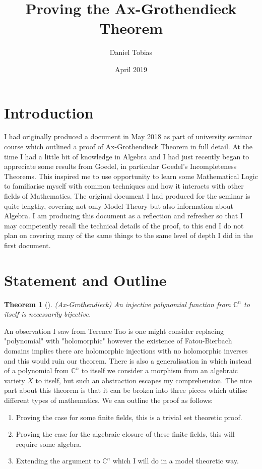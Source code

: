 \documentclass[a4paper]{article}
\title{Proving the Ax-Grothendieck Theorem}
\author{Daniel Tobias}
\date{April 2019}
\newtheorem{theorem}{Theorem}[section]
\newcommand{\C}{\mathbb{C}}
\begin{document}
\maketitle

\section{Introduction}
I had originally produced a document in May 2018 as part of university seminar course which outlined a proof of Ax-Grothendieck Theorem in full detail. At the time I had a little bit of knowledge in Algebra and I had just recently began to appreciate some results from Goedel, in particular Goedel's Incompleteness Theorems. This inspired me to use opportunity to learn some Mathematical Logic to familiarise myself with common techniques and how it interacts with other fields of Mathematics. The original document I had produced for the seminar is quite lengthy, covering not only Model Theory but also information about Algebra. I am producing this document as a reflection and refresher so that I may competently recall the technical details of the proof, to this end I do not plan on covering many of the same things to the same level of depth I did in the first document. 

\section{Statement and Outline}

\begin{theorem}[](Ax-Grothendieck)
An injective polynomial function from $\C^{n}$ to itself is necessarily bijective.
\end{theorem}
An observation I saw from Terence Tao is one might consider replacing "polynomial" with "holomorphic" however the existence of Fatou-Bierbach domains implies there are holomorphic injections with no holomorphic inverses and this would ruin our theorem. There is also a generalisation in which instead of a polynomial from $\C^{n}$ to itself we consider a morphism from an algebraic variety $X$ to itself, but such an abstraction escapes my comprehension. The nice part about this theorem is that it can be broken into three pieces which utilise different types of mathematics. We can outline the proof as follows:
\begin{enumerate}
	\item Proving the case for some finite fields, this is a trivial set theoretic proof.
	\item Proving the case for the algebraic closure of these finite fields, this will require some algebra.
	\item Extending the argument to $\C^{n}$ which I will do in a model theoretic way.
\end{enumerate}
\end{document}
